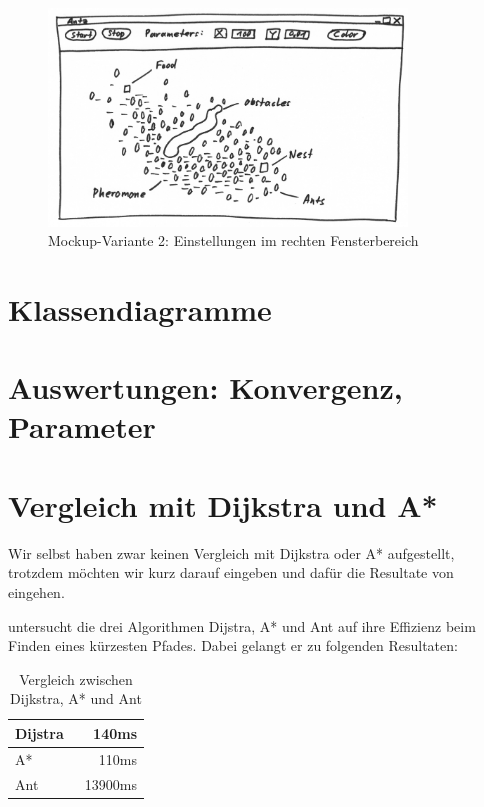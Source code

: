 \begin{figure}[h]
  \centering
	\includegraphics [width=0.85\textwidth]{images/Antz_Mockup_1_sw.png} 
	\caption{Mockup-Variante 2: Einstellungen im rechten Fensterbereich}
\end{figure}

\section{Klassendiagramme}

\section{Auswertungen: Konvergenz, Parameter}

\section{Vergleich mit Dijkstra und A*}

Wir selbst haben zwar keinen Vergleich mit Dijkstra oder A* aufgestellt, trotzdem möchten wir kurz darauf eingeben und dafür die Resultate von \citet*{leo-perf} eingehen.

\citeauthor*{leo-perf} untersucht die drei Algorithmen Dijstra, A* und Ant auf ihre Effizienz beim Finden eines kürzesten Pfades. Dabei gelangt er zu folgenden Resultaten:

\begin{table}[h]
\begin{tabular}{ | l | r | }
\hline
Dijstra & ~140ms \\
\hline
A* & ~110ms \\
\hline
Ant & ~13900ms \\
\hline
\end{tabular}
\caption{Vergleich zwischen Dijkstra, A* und Ant}
\end{table}

